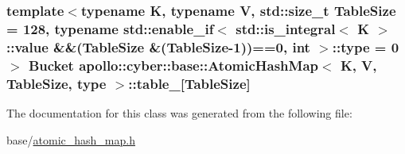 \hypertarget{classapollo_1_1cyber_1_1base_1_1AtomicHashMap_aab575e13b07e0465956aeb1aaef42e22}{
\subsubsection[{table\-\_\-}]{\setlength{\rightskip}{0pt plus 5cm}template$<$typename K, typename V, std\-::size\-\_\-t Table\-Size = 128, typename std\-::enable\-\_\-if$<$ std\-::is\-\_\-integral$<$ K $>$\-::value \&\&(\-Table\-Size \&(\-Table\-Size-\/1))==0, int $>$\-::type = 0$>$ {\bf Bucket} {\bf apollo\-::cyber\-::base\-::\-Atomic\-Hash\-Map}$<$ K, V, Table\-Size, type $>$\-::table\-\_\-\mbox{[}Table\-Size\mbox{]}\hspace{0.3cm}{\ttfamily [private]}}}\label{classapollo_1_1cyber_1_1base_1_1AtomicHashMap_aab575e13b07e0465956aeb1aaef42e22}


The documentation for this class was generated from the following file\-:\begin{DoxyCompactItemize}
\item 
base/\hyperlink{atomic__hash__map_8h}{atomic\-\_\-hash\-\_\-map.\-h}\end{DoxyCompactItemize}
